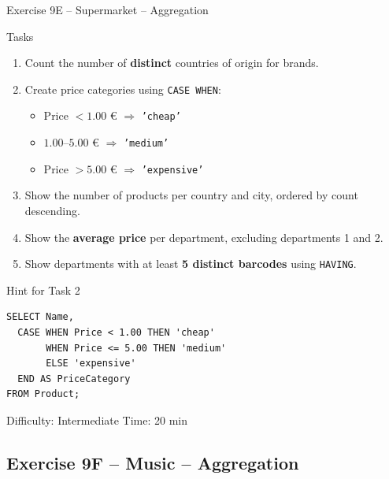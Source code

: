 \documentclass[10pt]{beamer}
\begin{document}
\begin{frame}[fragile]{Exercise 9E -- Supermarket -- Aggregation}
  \begin{block}{Tasks}
    \begin{enumerate}
      \item Count the number of \textbf{distinct} countries of origin for brands.
      \item Create price categories using \texttt{CASE WHEN}:
        \begin{itemize}
          \item Price $< 1.00$ \euro{} $\Rightarrow$ \texttt{'cheap'}
          \item $1.00$--$5.00$ \euro{} $\Rightarrow$ \texttt{'medium'}
          \item Price $> 5.00$ \euro{} $\Rightarrow$ \texttt{'expensive'}
        \end{itemize}
      \item Show the number of products per country and city, ordered by count descending.
      \item Show the \textbf{average price} per department, excluding departments 1 and 2.
      \item Show departments with at least \textbf{5 distinct barcodes} using \texttt{HAVING}.
    \end{enumerate}
  \end{block}

  \begin{block}{Hint for Task 2}
\begin{lstlisting}[style=sqlstyle]
SELECT Name,
  CASE WHEN Price < 1.00 THEN 'cheap'
       WHEN Price <= 5.00 THEN 'medium'
       ELSE 'expensive'
  END AS PriceCategory
FROM Product;
\end{lstlisting}
  \end{block}

  \begin{alertblock}{Difficulty: Intermediate \quad Time: 20 min}
  \end{alertblock}
\end{frame}

\subsection{Exercise 9F -- Music -- Aggregation}
\end{document}
